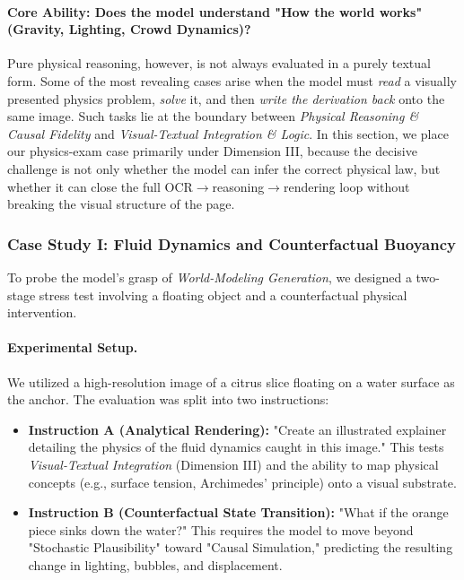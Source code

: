 \documentclass{llmxive}
\begin{document}
\paragraph{Core Ability: Does the model understand "How the world works" (Gravity, Lighting, Crowd Dynamics)?}
Pure physical reasoning, however, is not always evaluated in a purely textual form. Some of the most revealing cases arise when the model must \emph{read} a visually presented physics problem, \emph{solve} it, and then \emph{write the derivation back} onto the same image. Such tasks lie at the boundary between \textit{Physical Reasoning \& Causal Fidelity} and \textit{Visual-Textual Integration \& Logic}. In this section, we place our physics-exam case primarily under Dimension III, because the decisive challenge is not only whether the model can infer the correct physical law, but whether it can close the full OCR$\rightarrow$reasoning$\rightarrow$rendering loop without breaking the visual structure of the page.

\subsubsection{Case Study I: Fluid Dynamics and Counterfactual Buoyancy}
\label{subsubsec:fluid_dynamics_case}

To probe the model's grasp of \textit{World-Modeling Generation}, we designed a two-stage stress test involving a floating object and a counterfactual physical intervention.

\paragraph{Experimental Setup.}
We utilized a high-resolution image of a citrus slice floating on a water surface as the anchor. The evaluation was split into two instructions:
\begin{itemize}
\item \textbf{Instruction A (Analytical Rendering):} "Create an illustrated explainer detailing the physics of the fluid dynamics caught in this image." This tests \textit{Visual-Textual Integration} (Dimension III) and the ability to map physical concepts (e.g., surface tension, Archimedes' principle) onto a visual substrate.
\item \textbf{Instruction B (Counterfactual State Transition):} "What if the orange piece sinks down the water?" This requires the model to move beyond "Stochastic Plausibility" toward "Causal Simulation," predicting the resulting change in lighting, bubbles, and displacement.
\end{itemize}
\end{document}
